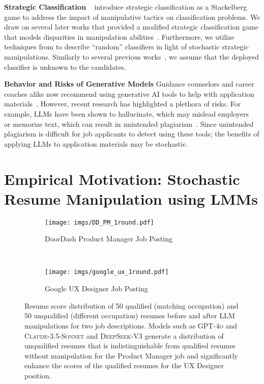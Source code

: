 \textbf{Strategic Classification}
~\citet{Hardt2015} introduce strategic classification as a Stackelberg game to address the impact of manipulative tactics on classification problems. We draw on several later works that provided a modified strategic classification game that models disparities in manipulation abilities~\citep{Hu2019, milli2019social, chen2020strategic, diana2024minimax}. Furthermore, we utilize techniques from \citep{Braverman2020} to describe ``random'' classifiers in light of stochastic strategic manipulations. Similarly to several previous works~\citep{GhalmeNETR21, cohen2024bayesian}, we assume that the deployed classifier is unknown to the candidates.

\textbf{Behavior and Risks of Generative Models} 
Guidance counselors and career coaches alike now recommend using generative AI tools to help with application materials~\citep{Verma_Renjarla_2024, Chamorro_2024}. However, recent research has highlighted a plethora of risks. For example, LLMs have been shown to hallucinate, which may mislead employers~\citep{huang2023survey} or memorize text, which can result in unintended plagiarism~\citep{carlini2022quantifying}. Since unintended plagiarism is difficult for job applicants to detect using these tools;  the benefits of applying LLMs to application materials may be stochastic. 

    
\section{Empirical Motivation: Stochastic Resume Manipulation using LMMs} \label{sec: empirical motivation}
\begin{figure*}[ht]
    \centering
        \centering
    \begin{subfigure}[t]{0.45\textwidth}
        \centering
        \texttt{[image: imgs/DD\_PM\_1round.pdf]}
        \caption{DoorDash Product Manager Job Posting}
    \end{subfigure}
    ~
    \begin{subfigure}[t]{0.45\textwidth}
        \centering
        \texttt{[image: imgs/google\_ux\_1round.pdf]}
        \caption{Google UX Designer Job Posting}
    \end{subfigure}%
    \caption{Resume score distribution of 50 qualified (matching occupation) and 50 unqualified (different occupation) resumes before and after LLM manipulations for two job descriptions. Models such as \textsc{GPT-4o} and \textsc{Claude-3.5-Sonnet} and \textsc{DeepSeek-V3} generate a distribution of unqualified resumes that is indistinguishable from qualified resumes without manipulation for the Product Manager job and significantly enhance the scores of the qualified resumes for the UX Designer position.}
    \label{fig:llm-resume-dd}
\end{figure*}

